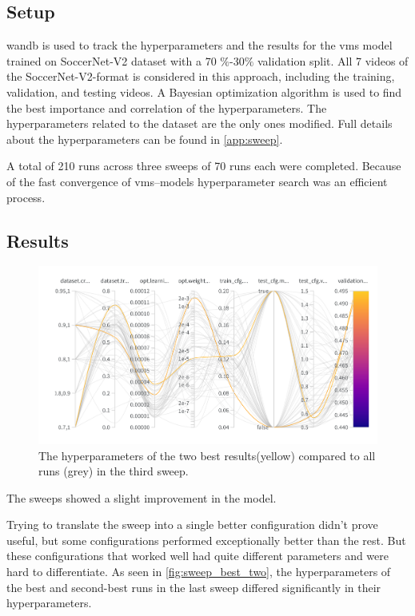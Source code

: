 \subsection{Setup}
\label{ssec:ex4_setup}

\acrlong{wandb} is used to track the hyperparameters and the results for the \acrshort{vms} model trained on SoccerNet-V2 dataset with a 70 \(\%\)-30\(\%\) validation split. All 7 videos of the SoccerNet-V2-format is considered in this approach, including the training, validation, and testing videos. A Bayesian optimization algorithm is used to find the best importance and correlation of the hyperparameters. The hyperparameters related to the dataset are the only ones modified. Full details about the hyperparameters can be found in \autoref{app:sweep}.

A total of 210 runs across three sweeps of 70 runs each were completed. Because of the fast convergence of \acrshort{vms}--models hyperparameter search was an efficient process. 


\subsection{Results}
\label{ssec:ex4_results}

\begin{figure}[ht]
    \centering
    \includegraphics[width=1\linewidth]{figures/sweep_two_best.png}
    \caption{The hyperparameters of the two best results(yellow) compared to all runs (grey) in the third sweep. }
    \label{fig:sweep_best_two}
\end{figure}

The sweeps showed a slight improvement in the model. 

Trying to translate the sweep into a single better configuration didn't prove useful, but some configurations performed exceptionally better than the rest. But these configurations that worked well had quite different parameters and were hard to differentiate. As seen in \autoref{fig:sweep_best_two}, the hyperparameters of the best and second-best runs in the last sweep differed significantly in their hyperparameters. 

